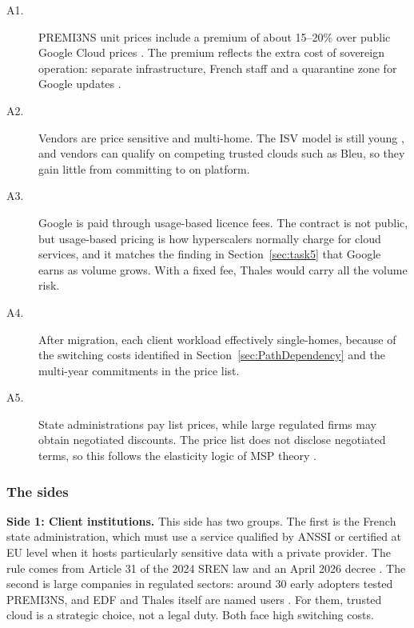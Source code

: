 \begin{description}
  \item [A1.] PREMI3NS unit prices include a premium of about 15--20\% over public Google Cloud prices \parencite{paperjam2026}. The premium reflects the extra cost of sovereign operation: separate infrastructure, French staff and a quarantine zone for Google updates \parencite{s3ns2025premi3ns}.  

  \item[A2.] Vendors are price sensitive and multi-home. The ISV model is still young \parencite{futurum2026}, and vendors can qualify on competing trusted clouds such as Bleu, so they gain little from committing to on platform.

  \item[A3.] Google is paid through usage-based licence fees. The contract is not public, but usage-based pricing is how hyperscalers normally charge for cloud services, and it matches the finding in Section~\ref{sec:task5} that Google earns as volume grows. With a fixed fee, Thales would carry all the volume risk.
  
  \item[A4.] After migration, each client workload effectively single-homes, because of the switching costs identified in Section~\ref{sec:PathDependency} and the multi-year commitments in the price list.
  \item[A5.] State administrations pay list prices, while large regulated firms may obtain negotiated discounts. The price list does not disclose negotiated terms, so this follows the elasticity logic of MSP theory \parencite{rochet2006}.
\end{description}

\subsubsection{The sides}

\textbf{Side 1: Client institutions.} This side has two groups. The first is the French state administration, which must use a service qualified by ANSSI or certified at EU level when it hosts particularly sensitive data with a private provider. The rule comes from Article 31 of the 2024 SREN law and an April 2026 decree \parencite{decretsren2026}. The second is large companies in regulated sectors: around 30 early adopters tested PREMI3NS, and EDF and Thales itself are named users \parencite{s3ns2025premi3ns}. For them, trusted cloud is a strategic choice, not a legal duty. Both face high switching costs.

